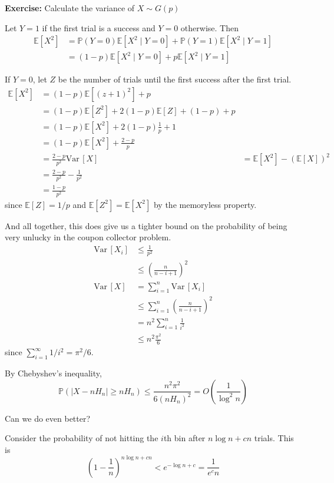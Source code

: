 \documentclass[12pt]{report}
\renewcommand{\P}{\mathbb{P}}
\newcommand{\E}{\mathbb{E}}
\newcommand{\abs}[1]{\left\vert #1 \right\vert}
\newcommand{\Var}{\text{Var}\,}
\newenvironment*{exercise}[1][red]{
    \begin{tcolorbox}[
        parbox=false,
        colback=#1!5!white,
        colframe=#1!75!black,
        breakable
    ]}
    {\end{tcolorbox}}
\begin{document}
\begin{exercise}
    \textbf{Exercise:} Calculate the variance of $X \sim G(p)$

    Let $Y =1$ if the first trial is a success and $Y= 0$ otherwise. Then 
    \begin{align*}
        \E[X^2] &= \P(Y= 0) \E[X^2 \; | \; Y= 0] + \P(Y = 1) \E[X^2 \; | \;Y= 1]\\ 
        &= (1 - p)\E[X^2 \; | \; Y= 0] + p\E[X^2 \; | \;Y= 1]
    \end{align*}

    If $Y = 0$, let $Z$ be the number of trials until the first success after the first trial. 
    \begin{align*}
        \E[X^2] &= (1 - p)\E[(z+1)^2] + p\\ 
        &= (1 - p)\E[Z^2] + 2(1- p)\E[Z] + (1 - p) + p\\
        &= (1 - p) \E[X^2] + 2(1 -p) \frac{1}{p} + 1\\ 
        &= (1 - p) \E[X^2] + \frac{2-p}{p}\\
        &= \frac{2-p}{p^2}
    \Var[X] &= \E[X^2] - (\E[X])^2\\ 
        &= \frac{2-p}{p^2} - \frac{1}{p^2}\\ 
        &= \frac{1-p}{p^2}
    \end{align*}
    since $\E[Z] = 1/p$ and $\E[Z^2] = \E[X^2]$ by the memoryless property.
\end{exercise}

And all together, this does give us a tighter bound on the probability of being very unlucky in the coupon collector problem.
\begin{align*}
    \Var[X_i] &\leq \frac{1}{p^2}\\ 
    &\leq \left(\frac{n}{n-i+1}\right)^2\\ 
    \Var[X] &= \sum_{i=1}^{n} \Var[X_i]\\
    &\leq \sum_{i=1}^n \left(\frac{n}{n-i+1}\right)^2\\
    &= n^2 \sum_{i=1}^{n} \frac{1}{i^2}\\
    &\leq n^2 \frac{\pi^2}{6} 
\end{align*}
since $\sum_{i=1}^{\infty} 1/i^2 = \pi^2/6$.

By Chebyshev's inequality,
\[\P(\abs{X - nH_n} \geq nH_n) \leq \frac{n^2 \pi^2}{6(nH_n)^2} = O\left(\frac{1}{\log^2 n}\right)\]

Can we do even better? 

Consider the probability of not hitting the $i$th bin after $n \log n + cn$ trials. This is
\[\left(1 - \frac{1}{n}\right)^{n \log n + cn} < e^{-\log n + c}  = \frac{1}{e^c n}\]
\end{document}
